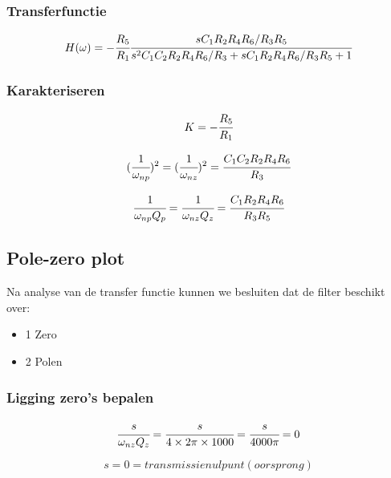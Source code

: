 \documentclass[]{article}
\begin{document}
\subsubsection*{Transferfunctie}
\begin{equation*}
H(\omega) = -	\cfrac{R_{5}}{R_{1}} 
\cfrac{sC_{1}R_{2}R_{4}R_{6}/R_{3}R_{5}}
{s^{2}C_{1}C_{2}R_{2}R_{4}R_{6}/R_{3}+sC_{1}R_{2}R_{4}R_{6}/R_{3}R_{5}+1}
\end{equation*}

\subsubsection*{Karakteriseren}
\begin{equation*}
K = -	\cfrac{R_{5}}{R_{1}} 
\end{equation*}

\begin{equation*}
(\cfrac{1}{\omega_{np}})^{2} = (\cfrac{1}{\omega_{nz}})^{2} = \cfrac{C_{1}C_{2}R_{2}R_{4}R_{6}}{R_{3}}
\end{equation*}

\begin{equation*}
\cfrac{1}{\omega_{np}Q_{p}} = \cfrac{1}{\omega_{nz}Q_{z}} = \cfrac{C_{1}R_{2}R_{4}R_{6}}{R_{3}R_{5}} 
\end{equation*}


\subsection*{Pole-zero plot}

Na analyse van de transfer functie kunnen we besluiten dat de filter beschikt over:

\begin{itemize}
	\item 1 Zero
	\item 2 Polen
\end{itemize}

\subsubsection*{Ligging zero's bepalen}

\begin{equation*}
\cfrac{s}{\omega_{nz}Q_{z}} = \cfrac{s}{4\times2\pi\times1000} = \cfrac{s}{4000\pi} = 0
\end{equation*}


\begin{equation*}
\boxed{s = 0 = transmissienulpunt(oorsprong)}
\end{equation*}
\end{document}
